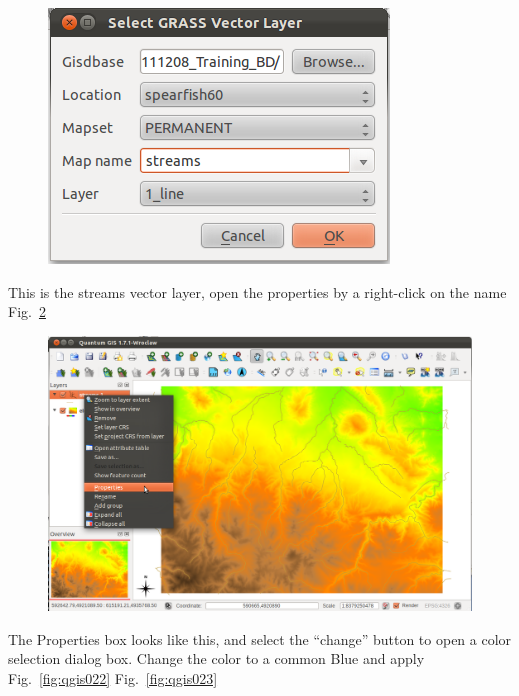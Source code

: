 \begin{figure}[htbp]
   \centering
   \includegraphics[scale=0.45]{qgis020.png}
   \caption{}
   \label{fig:qgis020}
\end{figure}

This is the streams vector layer, open the properties by a right{}-click
on the name Fig.~\ref{fig:qgis021}

\begin{figure}[htbp]
   \centering
   \includegraphics[scale=0.2]{qgis021.png}
   \caption{}
   \label{fig:qgis021}
\end{figure}

The Properties box looks like this, and select the ``change'' button
to open a color selection dialog box. Change the color to a common Blue
and apply Fig.~\ref{fig:qgis022} Fig.~\ref{fig:qgis023}

